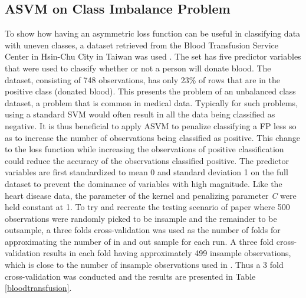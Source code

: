 \documentclass[twoside,11pt]{article}
\begin{document}
\subsection{ASVM on Class Imbalance Problem}
To show how having an asymmetric loss function can be useful in classifying data with uneven classes, a dataset retrieved from the Blood Transfusion Service Center in Hsin-Chu City in Taiwan was used \citep{Yeh09}. The set has five predictor variables that were used to classify whether or not a person will donate blood. The dataset, consisting of 748 observations, has only 23\% of rows that are in the positive class (donated blood). This presents the problem of an unbalanced class dataset, a problem that is common in medical data. Typically for such problems, using a standard SVM would often result in all the data being classified as negative. It is thus beneficial to apply ASVM to penalize classifying a FP less so as to increase the number of observations being classified as positive. This change to the loss function while increasing the observations of positive classification could reduce the accuracy of the observations classified positive. The predictor variables are first standardized to mean 0 and standard deviation 1 on the full dataset to prevent the dominance of variables with high magnitude. Like the heart disease data, the parameter of the kernel and penalizing parameter \emph{C} were held constant at 1. To try and recreate the testing scenario of \citet{Yeh09} paper where 500 observations were randomly picked to be insample and the remainder to be outsample, a three folds cross-validation was used as the number of folds for approximating the number of in and out sample for each run. A three fold cross-validation results in each fold having approximately 499 insample observations, which is close to the number of insample observations used in \citet{Yeh09}. Thus a 3 fold cross-validation was conducted and the results are presented in Table \ref{bloodtransfusion}.
\end{document}
